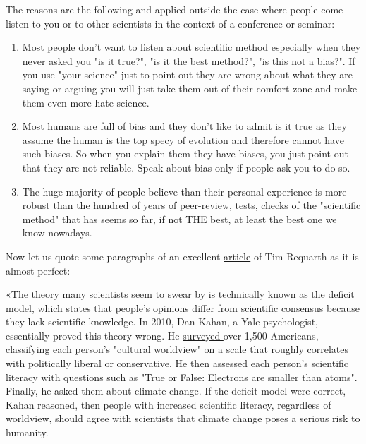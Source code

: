 	The reasons are the following and applied outside the case where people come listen to you or to other scientists in the context of a conference or seminar:
	\begin{enumerate}
		\item Most people don't want to listen about scientific method especially when they never asked you "is it true?", "is it the best method?", "is this not a bias?". If you use "your science" just to point out they are wrong about what they are saying or arguing you will just take them out of their comfort zone and make them even more hate science.
		
		\item Most humans are full of bias and they don't like to admit is it true as they assume the human is the top specy of evolution and therefore cannot have such biases. So when you explain them they have biases, you just point out that they are not reliable. Speak about bias only if people ask you to do so.
		
		\item The huge majority of people believe than their personal experience is more robust than the hundred of years of peer-review, tests, checks of the "scientific method" that has seems so far, if not THE best, at least the best one we know nowadays.
	\end{enumerate}
	Now let us quote some paragraphs of an excellent \href{http://www.slate.com/articles/health_and_science/science/2017/04/explaining_science_won_t_fix_information_illiteracy.html}{{\color{blue} article}} of Tim Requarth as it is almost perfect:
	

	«The theory many scientists seem to swear by is technically known as the deficit model, which states that people's opinions differ from scientific consensus because they lack scientific knowledge. In 2010, Dan Kahan, a Yale psychologist, essentially proved this theory wrong. He \href{http://www.nature.com/nclimate/journal/v2/n10/full/nclimate1547.html}{{\color{blue} surveyed }} over 1,500 Americans, classifying each person's "cultural worldview" on a scale that roughly correlates with politically liberal or conservative. He then assessed each person's scientific literacy with questions such as "True or False: Electrons are smaller than atoms". Finally, he asked them about climate change. If the deficit model were correct, Kahan reasoned, then people with increased scientific literacy, regardless of worldview, should agree with scientists that climate change poses a serious risk to humanity.
  
